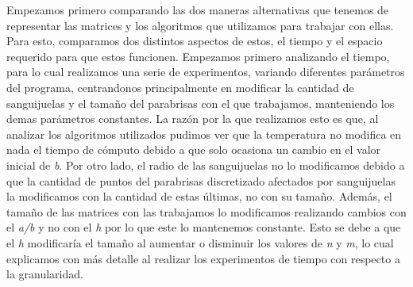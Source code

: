 \documentclass[10pt, a4paper]{article}
\begin{document}
Empezamos primero comparando las dos maneras alternativas que tenemos de representar las matrices y los algoritmos que utilizamos para trabajar con ellas. Para esto, comparamos dos distintos aspectos de estos, el tiempo y el espacio requerido para que estos funcionen. Empezamos primero analizando el tiempo, para lo cual realizamos una serie de experimentos, variando diferentes par\'ametros del programa, centrandonos principalmente en modificar la cantidad de sanguijuelas y el tamaño del parabrisas con el que trabajamos, manteniendo los demas par\'ametros constantes. La raz\'on por la que realizamos esto es que, al analizar los algoritmos utilizados pudimos ver que la temperatura no modifica en nada el tiempo de c\'omputo debido a que solo ocasiona un cambio en el valor inicial de \textit{b}. Por otro lado, el radio de las sanguijuelas no lo modificamos debido a que la cantidad de puntos del parabrisas discretizado afectados por sanguijuelas la modificamos con la cantidad de estas \'ultimas, no con su tamaño. Adem\'as, el tamaño de las matrices con las trabajamos lo modificamos realizando cambios con el \textit{a/b} y no con el \textit{h} por lo que este lo mantenemos constante. Esto se debe a que el \textit{h} modificar\'ia el tamaño al aumentar o disminuir los valores de \textit{n} y \textit{m}, lo cual explicamos con m\'as detalle al realizar los experimentos de tiempo con respecto a la granularidad. 
\end{document}
